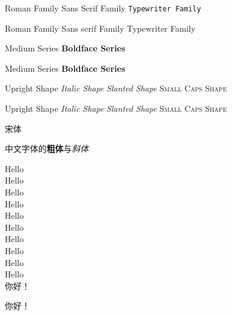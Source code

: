 \documentclass[10pt]{article} %
\newcommand{\myfont}{\textif{\textbf{\textsf{}}}}
\begin{document}
    \textrm{Roman Family} %
    \textsf{Sans Serif Family} %
    \texttt{Typewriter Family} %

    \rmfamily Roman Family %
    {\sffamily Sans serif Family} %
    {\ttfamily Typewriter Family}


    \textmd{Medium Series} \textbf{Boldface Series}

    {\mdseries Medium Series} {\bfseries Boldface Series}

    \textup{Upright Shape} \textit{Italic Shape}
    \textsl{Slanted Shape} \textsc{Small Caps Shape}

    {\upshape Upright Shape} {\itshape Italic Shape}
    {\slshape Slanted Shape} {\scshape Small Caps Shape}


    {\songti 宋体}   

    中文字体的\textbf{粗体}与\textit{斜体}


    {\tiny          Hello}\\
    {\scriptsize    Hello}\\
    {\footnotesize  Hello}\\
    {\small         Hello}\\
    {\normalsize    Hello}\\
    {\large         Hello}\\
    {\Large         Hello}\\
    {\LARGE         Hello}\\
    {\huge          Hello}\\
    {\Huge          Hello}\\


     你好！

     你好！

\end{document}
